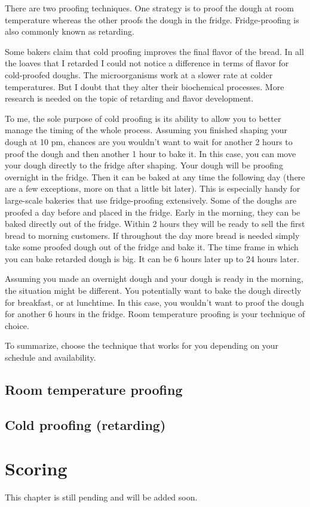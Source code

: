 There are two proofing techniques. One strategy is to proof the dough
at room temperature whereas the other proofs the dough in the fridge.
Fridge-proofing is also commonly known as retarding.

Some bakers claim that cold proofing improves the final flavor of the bread.
In all the loaves that I retarded I could not notice a difference
in terms of flavor for cold-proofed doughs. The microorganisms work
at a slower rate at colder temperatures. But I doubt that they alter
their biochemical processes. More research is needed on the topic
of retarding and flavor development.

To me, the sole purpose of cold proofing is its ability to allow you
to better manage the timing of the whole process. Assuming you finished shaping
your dough at 10 pm, chances are you wouldn't want to wait for another
2 hours to proof the dough and then another 1 hour to bake it. In this case,
you can move your dough directly to the fridge after shaping. Your
dough will be proofing overnight in the fridge. Then it can be baked at any time
the following day (there are a few exceptions, more on that a little bit later).
This is especially handy for large-scale bakeries that use fridge-proofing
extensively. Some of the doughs are proofed a day before and placed in the fridge.
Early in the morning, they can be baked directly out of the fridge. Within 2
hours they will be ready to sell the first bread to morning customers. If
throughout the day more bread is needed simply take some proofed dough out
of the fridge and bake it. The time frame in which you can bake retarded
dough is big. It can be 6 hours later up to 24 hours later.

Assuming you made an overnight dough and your dough is ready in the morning,
the situation might be different. You potentially want to bake the dough directly
for breakfast, or at lunchtime. In this case, you wouldn't want to proof the dough for
another 6 hours in the fridge. Room temperature proofing is your technique
of choice.

To summarize, choose the technique that works for you depending on your
schedule and availability.

\subsection{Room temperature proofing}

\subsection{Cold proofing (retarding)}

\section{Scoring}
This chapter is still pending and will be added soon.
